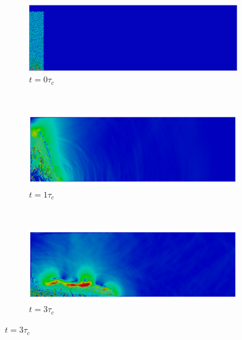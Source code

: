 \begin{figure}
\begin{subfigure}[b]{0.975\textwidth}
	\centering
    \includegraphics[width=\textwidth]{a4/a4_0}
    \caption*{$t = 0\tau_c$}
    \label{fig:a4_0}
\end{subfigure}
\\
\begin{subfigure}[b]{0.975\textwidth}
	\centering
    \includegraphics[width=\textwidth]{a4/a4_tc}
    \caption*{$t = 1\tau_c$}
    \label{fig:a4_tc}
\end{subfigure}
\\
\begin{subfigure}[b]{0.975\textwidth}
	\centering
    \includegraphics[width=\textwidth]{a4/a4_3tc}
    \caption*{$t = 3\tau_c$}
    \label{fig:a4_3tc}
\end{subfigure}
\end{figure}
